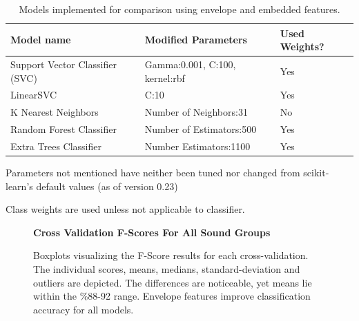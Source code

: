 \documentclass[\main/thesis.tex]{subfiles}
\begin{document}
\begin{table}[t]
    \centering \hspace*{-0.8cm}
    \begin{threeparttable}
    \begin{tabular}[width=0.95\paperwidth]{|l|l|l|}
    \hline
    Model name & Modified Parameters\tnote{\dag}  & Used Weights? \tnote{\ddag} \\\hline
     Support Vector Classifier (SVC) &  Gamma:0.001, C:100, kernel:rbf & Yes\\
     LinearSVC & C:10 & Yes\\
     K Nearest Neighbors & Number of Neighbors:31 &  No \\
     Random Forest Classifier & Number of Estimators:500 & Yes \\
     Extra Trees Classifier & Number Estimators:1100 & Yes\\
     \hline
    \end{tabular}
    \caption{Models implemented for comparison using envelope and embedded features. }
    \begin{tablenotes}
    \item[\dag] Parameters not mentioned have neither been tuned nor changed from scikit-learn's default values (as of version 0.23)
    \item[\ddag] Class weights are used unless not applicable to classifier.
    \end{tablenotes}
    \label{table:mem_model_selection}
    \end{threeparttable}
\end{table}

\begin{figure}[htbp!]
    \begin{center}
    \textbf{Cross Validation F-Scores For All Sound Groups}\par\medskip
    \caption{Boxplots visualizing the F-Score results for each cross-validation. The individual scores, means, medians, standard-deviation and outliers are depicted. The differences are noticeable, yet means lie within the \%88-92 range. Envelope features improve classification accuracy for all models. }
    \label{fig:f1_allg_box}
    \end{center}
\end{figure}
\end{document}

